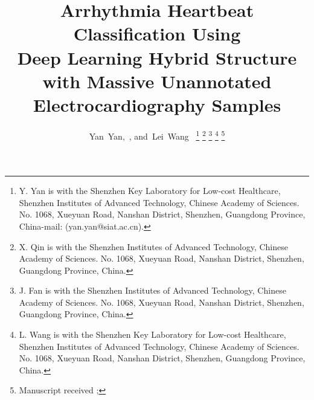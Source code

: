 \documentclass[journal]{IEEEtran}
\begin{document}
%
\title{Arrhythmia Heartbeat Classification Using \\Deep Learning Hybrid Structure with Massive Unannotated Electrocardiography Samples}
%
%

\author{Yan~Yan,~,
        and~Lei~Wang~%
\thanks{Y. Yan is with the Shenzhen Key Laboratory for Low-cost Healthcare, Shenzhen Institutes of Advanced Technology, Chinese Academy of Sciences. No. 1068, Xueyuan Road, Nanshan District,
Shenzhen, Guangdong Province, China-mail: (yan.yan@siat.ac.cn).}%
\thanks{X. Qin is with the Shenzhen Institutes of Advanced Technology, Chinese Academy of Sciences.
No. 1068, Xueyuan Road, Nanshan District, Shenzhen, Guangdong Province, China.}%
\thanks{J. Fan is with the Shenzhen Institutes of Advanced Technology, Chinese Academy of Sciences. No. 1068, Xueyuan Road, Nanshan District, Shenzhen, Guangdong Province, China.}%
\thanks{L. Wang is with the Shenzhen Key Laboratory for Low-cost Healthcare, Shenzhen Institutes of Advanced Technology, Chinese Academy of Sciences.
No. 1068, Xueyuan Road, Nanshan District,
Shenzhen, Guangdong Province, China.}%
\thanks{Manuscript received ; }}

% 
%
\end{document}

